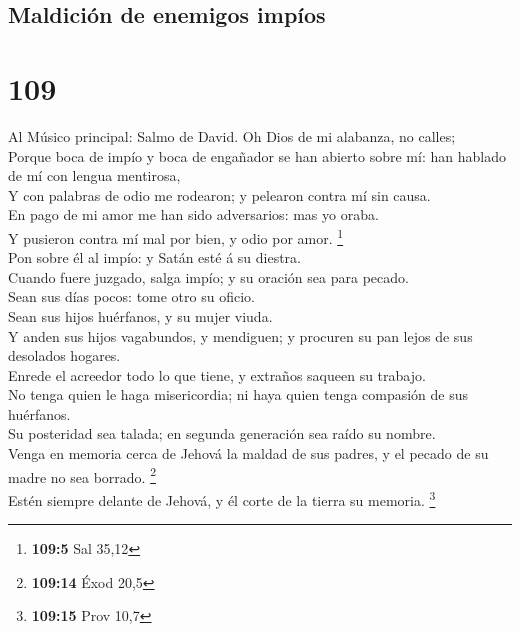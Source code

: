 \hypertarget{maldiciuxf3n-de-enemigos-impuxedos}{%
\subsection{Maldición de enemigos
impíos}\label{maldiciuxf3n-de-enemigos-impuxedos}}

\hypertarget{section-108}{%
\section{109}\label{section-108}}

 Al Músico principal: Salmo de David. Oh Dios de mi
alabanza, no calles;\\
 Porque boca de impío y boca de engañador se han abierto
sobre mí: han hablado de mí con lengua mentirosa,\\
 Y con palabras de odio me rodearon; y pelearon contra mí
sin causa.\\
 En pago de mi amor me han sido adversarios: mas yo
oraba.\\
 Y pusieron contra mí mal por bien, y odio por amor.
\footnote{\textbf{109:5} Sal 35,12}\\
 Pon sobre él al impío: y Satán esté á su diestra.\\
 Cuando fuere juzgado, salga impío; y su oración sea para
pecado.\\
 Sean sus días pocos: tome otro su oficio.\\
 Sean sus hijos huérfanos, y su mujer viuda.\\
 Y anden sus hijos vagabundos, y mendiguen; y procuren su
pan lejos de sus desolados hogares.\\
 Enrede el acreedor todo lo que tiene, y extraños saqueen
su trabajo.\\
 No tenga quien le haga misericordia; ni haya quien tenga
compasión de sus huérfanos.\\
 Su posteridad sea talada; en segunda generación sea
raído su nombre.\\
 Venga en memoria cerca de Jehová la maldad de sus
padres, y el pecado de su madre no sea borrado. \footnote{\textbf{109:14}
  Éxod 20,5}\\
 Estén siempre delante de Jehová, y él corte de la tierra
su memoria. \footnote{\textbf{109:15} Prov 10,7}\\
